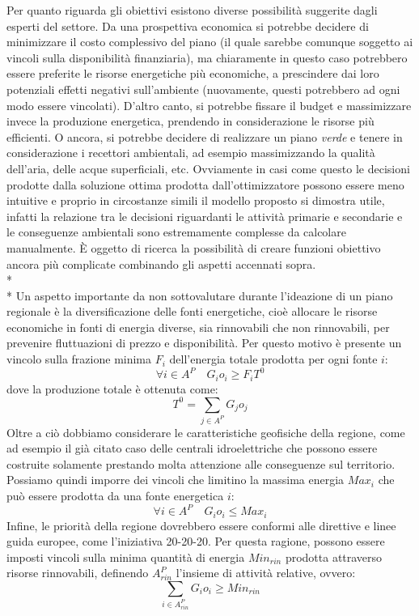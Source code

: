 \documentclass[12pt,a4paper,openright,twoside]{report}
\begin{document}
Per quanto riguarda gli obiettivi esistono diverse possibilità suggerite dagli esperti del settore. Da una prospettiva economica si potrebbe decidere di minimizzare il costo complessivo del piano (il quale sarebbe comunque soggetto ai vincoli sulla disponibilità finanziaria), ma chiaramente in questo caso potrebbero essere preferite le risorse energetiche più economiche, a prescindere dai loro potenziali effetti negativi sull'ambiente (nuovamente, questi potrebbero ad ogni modo essere vincolati). D'altro canto, si potrebbe fissare il budget e massimizzare invece la produzione energetica, prendendo in considerazione le risorse più efficienti. O ancora, si potrebbe decidere di realizzare un piano \emph{verde} e tenere in considerazione i recettori ambientali, ad esempio massimizzando la qualità dell'aria, delle acque superficiali, etc. Ovviamente in casi come questo le decisioni prodotte dalla soluzione ottima prodotta dall'ottimizzatore possono essere meno intuitive e proprio in circostanze simili il modello proposto si dimostra utile, infatti la relazione tra le decisioni riguardanti le attività primarie e secondarie e le conseguenze ambientali sono estremamente complesse da calcolare manualmente. \`E oggetto di ricerca la possibilità di creare funzioni obiettivo ancora più complicate combinando gli aspetti accennati sopra.
\\*\\*
Un aspetto importante da non sottovalutare durante l'ideazione di un piano regionale è la diversificazione delle fonti energetiche, cioè allocare le risorse economiche in fonti di energia diverse, sia rinnovabili che non rinnovabili, per prevenire fluttuazioni di prezzo e disponibilità. Per questo motivo è presente un vincolo sulla frazione minima $F_i$ dell'energia totale prodotta per ogni fonte $i$: 
\begin{equation}
\label{eq:fracEner}
	\forall i \in A^P \quad G_i o_i \geq F_i T^0
\end{equation}  
dove la produzione totale è ottenuta come: 
\begin{equation}
\label{eq:prodTot}
	T^0 = \sum_{j \in A^P} G_j o_j 
\end{equation}  
Oltre a ciò dobbiamo considerare le caratteristiche geofisiche della regione, come ad esempio il già citato caso delle centrali idroelettriche che possono essere costruite solamente prestando molta attenzione alle conseguenze sul territorio. Possiamo quindi imporre dei vincoli che limitino la massima energia $Max_i$ che può essere prodotta da una fonte energetica $i$:
\begin{equation}
\label{eq:maxEner}
	\forall i \in A^P \quad G_i o_i \leq Max_i
\end{equation}  
Infine, le priorità della regione dovrebbero essere conformi alle direttive e linee guida europee, come l'iniziativa 20-20-20. Per questa ragione, possono essere imposti vincoli sulla minima quantità di energia $Min_{rin}$ prodotta attraverso risorse rinnovabili, definendo $A^P_{rin}$ l'insieme di attività relative, ovvero:
\begin{equation}
\label{eq:minEnerRen}
	\sum_{i \in A^P_{rin}} G_i o_i \geq  Min_{rin}
\end{equation}  
\end{document}
